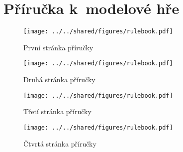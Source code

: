 \chapter{Příručka k~modelové hře}
\label{chap:rulebook}

\begin{figure}[h]
    \centering
    \texttt{[image: ../../shared/figures/rulebook.pdf]}
    \caption{První stránka příručky}
    \label{fig:rulebook1}
\end{figure}

\begin{figure}[h]
    \centering
    \texttt{[image: ../../shared/figures/rulebook.pdf]}
    \caption{Druhá stránka příručky}
    \label{fig:rulebook2}
\end{figure}

\begin{figure}[h]
    \centering
    \texttt{[image: ../../shared/figures/rulebook.pdf]}
    \caption{Třetí stránka příručky}
    \label{fig:rulebook3}
\end{figure}

\begin{figure}[h]
    \centering
    \texttt{[image: ../../shared/figures/rulebook.pdf]}
    \caption{Čtvrtá stránka příručky}
    \label{fig:rulebook4}
\end{figure}
